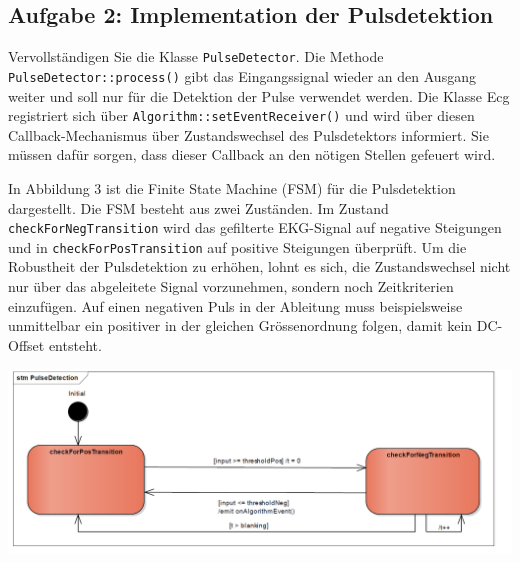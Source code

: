 
\noindent\makebox[\linewidth]{\rule{\paperwidth}{0.4pt}}

\noindent\makebox[\linewidth]{\rule{\paperwidth}{0.4pt}}

\noindent\makebox[\linewidth]{\rule{\paperwidth}{0.4pt}}

\noindent\makebox[\linewidth]{\rule{\paperwidth}{0.4pt}}


\subsection{Aufgabe 2: Implementation der Pulsdetektion}
Vervollständigen Sie die Klasse \texttt{PulseDetector}. Die Methode \texttt{PulseDetector::process()} gibt das Eingangssignal wieder an den Ausgang weiter und soll nur für die Detektion der Pulse verwendet werden. Die Klasse Ecg registriert sich über \texttt{Algorithm::setEventReceiver()} und wird über diesen Callback-Mechanismus über Zustandswechsel des Pulsdetektors informiert. Sie müssen dafür sorgen, dass dieser Callback an den nötigen Stellen gefeuert wird.

In Abbildung 3 ist die Finite State Machine (FSM) für die Pulsdetektion dargestellt. Die FSM besteht aus zwei Zuständen. Im Zustand \texttt{checkForNegTransition} wird das gefilterte EKG-Signal auf negative Steigungen und in \texttt{checkForPosTransition} auf positive Steigungen überprüft. Um die Robustheit der Pulsdetektion zu erhöhen, lohnt es sich, die Zustandswechsel nicht nur über das abgeleitete Signal vorzunehmen, sondern noch Zeitkriterien einzufügen. Auf einen negativen Puls in der Ableitung muss beispielsweise unmittelbar ein positiver in der gleichen Grössenordnung folgen, damit kein DC-Offset entsteht.

\begin{center}
  \includegraphics[width=1\linewidth]{900-Praktika/prak08/3.PNG}
\end{center}

